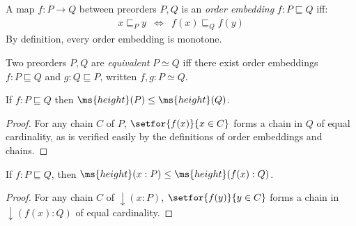 \documentclass{article}
\newcommand{\ale}{\sqsubseteq}
\newcommand{\ordle}{\ale}
\newcommand{\ordeq}{\simeq}
\newcommand{\height}{\ms{height}}
\newcommand{\elemheight}[2]{\height(#2 : #1)}
\newcommand{\down}[2]{\mathop{\downarrow}(#2 : #1)}
\begin{document}
\begin{definition}\label{def:ordinj}
  A map $f : P \to Q$ between preorders $P,Q$ is an \emph{order embedding} $f :
  P \ordle Q$ iff:
  \begin{eqnarray*}
    x \ale_P y &\iff& f(x) \ale_Q f(y)
  \end{eqnarray*}
  By definition, every order embedding is monotone.
\end{definition}

\begin{definition}\label{def:ordeq}
  Two preorders $P,Q$ are \emph{equivalent} $P \ordeq Q$ iff there exist
  order embeddings $f : P \ordle Q$ and $g : Q \ordle P$, written $f,g : P
  \ordeq Q$.
\end{definition}



\begin{theorem}\label{thm:height-le}
  If $f : P \ale Q$ then $\height(P) \le \height(Q)$.
\end{theorem}
\begin{proof}
  For any chain $C$ of $P$, $\setfor{f(x)}{x \in C}$ forms a chain in $Q$ of
  equal cardinality, as is verified easily by the definitions of order
  embeddings and chains.
\end{proof}

\begin{theorem}
  \label{thm:elemheight-le}
  If $f : P \ordle Q$, then $\elemheight{P}{x} \le \elemheight{Q}{f(x)}$.
\end{theorem}
\begin{proof}
  For any chain $C$ of $\down{P}{x}$, $\setfor{f(y)}{y \in C}$ forms a chain in
  $\down{Q}{f(x)}$ of equal cardinality.
\end{proof}
\end{document}
